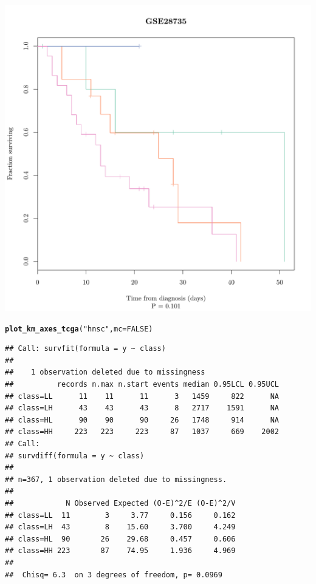 \documentclass{article}\usepackage[]{graphicx}\usepackage[]{color}
\makeatletter
\def\maxwidth{ %
  \ifdim\Gin@nat@width>\linewidth
    \linewidth
  \else
    \Gin@nat@width
  \fi
}
\newcommand{\hlnum}[1]{\textcolor[rgb]{0.686,0.059,0.569}{#1}}%
\newcommand{\hlstr}[1]{\textcolor[rgb]{0.192,0.494,0.8}{#1}}%
\newcommand{\hlstd}[1]{\textcolor[rgb]{0.345,0.345,0.345}{#1}}%
\newcommand{\hlkwc}[1]{\textcolor[rgb]{0.333,0.667,0.333}{#1}}%
\newcommand{\hlkwd}[1]{\textcolor[rgb]{0.737,0.353,0.396}{\textbf{#1}}}%
\newenvironment{kframe}{%
 \def\at@end@of@kframe{}%
 \ifinner\ifhmode%
  \def\at@end@of@kframe{\end{minipage}}%
  \begin{minipage}{\columnwidth}%
 \fi\fi%
 \def\FrameCommand##1{\hskip\@totalleftmargin \hskip-\fboxsep
 \colorbox{shadecolor}{##1}\hskip-\fboxsep
     \hskip-\linewidth \hskip-\@totalleftmargin \hskip\columnwidth}%
 \MakeFramed {\advance\hsize-\width
   \@totalleftmargin\z@ \linewidth\hsize
   \@setminipage}}%
 {\par\unskip\endMakeFramed%
 \at@end@of@kframe}
\newenvironment{knitrout}{}{} %
\makeatother
\begin{document}
\begin{knitrout}
{}




{\centering \includegraphics[width=\maxwidth]{figure/km-curves-6} 

}


\begin{kframe}\begin{alltt}
\hlkwd{plot_km_axes_tcga}\hlstd{(}\hlstr{"hnsc"}\hlstd{,} \hlkwc{mc} \hlstd{=} \hlnum{FALSE}\hlstd{)}
\end{alltt}
\begin{verbatim}
## Call: survfit(formula = y ~ class)
## 
##    1 observation deleted due to missingness 
##          records n.max n.start events median 0.95LCL 0.95UCL
## class=LL      11    11      11      3   1459     822      NA
## class=LH      43    43      43      8   2717    1591      NA
## class=HL      90    90      90     26   1748     914      NA
## class=HH     223   223     223     87   1037     669    2002
## Call:
## survdiff(formula = y ~ class)
## 
## n=367, 1 observation deleted due to missingness.
## 
##            N Observed Expected (O-E)^2/E (O-E)^2/V
## class=LL  11        3     3.77     0.156     0.162
## class=LH  43        8    15.60     3.700     4.249
## class=HL  90       26    29.68     0.457     0.606
## class=HH 223       87    74.95     1.936     4.969
## 
##  Chisq= 6.3  on 3 degrees of freedom, p= 0.0969
\end{verbatim}
\end{kframe}


\end{knitrout}
\end{document}
